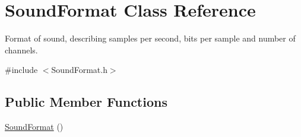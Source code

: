 \hypertarget{class_sound_format}{
\section{SoundFormat Class Reference}
\label{class_sound_format}
}


Format of sound, describing samples per second, bits per sample and number of channels.  




{\ttfamily \#include $<$SoundFormat.h$>$}

\subsection*{Public Member Functions}
\begin{DoxyCompactItemize}
\item 
\hypertarget{class_sound_format_a0f7932e8739b7f3e655323e6966a2a30}{
\hyperlink{class_sound_format_a0f7932e8739b7f3e655323e6966a2a30}{SoundFormat} ()}
\label{class_sound_format_a0f7932e8739b7f3e655323e6966a2a30}


\end{DoxyCompactItemize}
